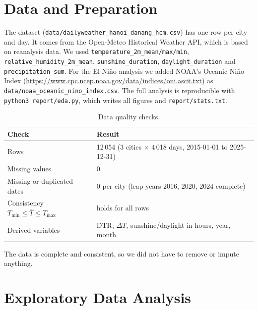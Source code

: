 \documentclass[11pt,a4paper]{article}
\begin{document}
\section{Data and Preparation}
The dataset (\texttt{data/dailyweather\_hanoi\_danang\_hcm.csv}) has one row per city and day.
It comes from the Open-Meteo Historical Weather API, which is based on reanalysis data. We used
\texttt{temperature\_2m\_mean/max/min}, \texttt{relative\_humidity\_2m\_mean}, \texttt{sunshine\_duration},
\texttt{daylight\_duration} and \texttt{precipitation\_sum}.
For the El Niño analysis we added NOAA's Oceanic Niño Index (\url{https://www.cpc.ncep.noaa.gov/data/indices/oni.ascii.txt}) as \texttt{data/noaa\_oceanic\_nino\_index.csv}.
The full analysis is reproducible with \texttt{python3 report/eda.py}, which writes all figures and \texttt{report/stats.txt}.

\begin{table}[H]
\centering\small
\begin{tabular}{ll}
\toprule
Check & Result \\
\midrule
Rows & 12\,054 (3 cities $\times$ 4\,018 days, 2015-01-01 to 2025-12-31) \\
Missing values & 0 \\
Missing or duplicated dates & 0 per city (leap years 2016, 2020, 2024 complete) \\
Consistency $T_{\min}\le\bar T\le T_{\max}$ & holds for all rows \\
Derived variables & DTR, $\Delta T$, sunshine/daylight in hours, year, month \\
\bottomrule
\end{tabular}
\caption{Data quality checks.}
\end{table}

The data is complete and consistent, so we did not have to remove or impute anything.

\section{Exploratory Data Analysis}
\end{document}
